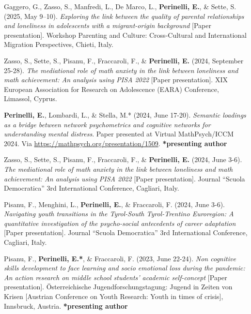 \documentclass[hidelinks, letterpaper,10pt]{article} %
\begin{document}
\begin{etaremune}
	\item Gaggero, G., Zasso, S., Manfredi, L., De Marco, L., \textbf{Perinelli, E.}, \& Sette, S. (2025, May 9–10). \textit{Exploring the link between the quality of parental relationships and loneliness in adolescents with a migrant-origin background} [Paper presentation]. Workshop Parenting and Culture: Cross-Cultural and International Migration Perspectives, Chieti, Italy.
	
	\item Zasso, S., Sette, S., Pisanu, F., Fraccaroli, F., \& \textbf{Perinelli, E.} (2024, September 25-28). \textit{The mediational role of math anxiety in the link between loneliness and math achievement: An analysis using PISA 2022} [Paper presentation]. XIX European Association for Research on Adolescence (EARA) Conference, Limassol, Cyprus.

	\item \textbf{Perinelli, E.}, Lombardi, L., \& Stella, M.* (2024, June 17-20). \textit{Semantic loadings as a bridge between network psychometrics and cognitive networks for understanding mental distress}. Paper presented at Virtual MathPsych/ICCM 2024. Via \url{https://mathpsych.org/presentation/1509}. \textbf{*presenting author}
	
	\item Zasso, S., Sette, S., Pisanu, F., Fraccaroli, F., \& \textbf{Perinelli, E.} (2024, June 3-6). \textit{The mediational role of math anxiety in the link between loneliness and math achievement: An analysis using PISA 2022} [Paper presentation]. Journal ``Scuola Democratica'' 3rd International Conference, Cagliari, Italy.

	\item Pisanu, F., Menghini, L., \textbf{Perinelli, E.}, \& Fraccaroli, F. (2024, June 3-6). \textit{Navigating youth transitions in the Tyrol-South Tyrol-Trentino Euroregion: A quantitative investigation of the psycho-social antecedents of career adaptation} [Paper presentation]. Journal ``Scuola Democratica'' 3rd International Conference, Cagliari, Italy.

	\item Pisanu, F., \textbf{Perinelli, E.*}, \& Fraccaroli, F. (2023, June 22-24). \textit{Non cognitive skills development to face learning and socio emotional loss during the pandemic: An action research on middle school students' academic self-concept} [Paper presentation]. Österreichische Jugendforschungstagung: Jugend in Zeiten von Krisen [Austrian Conference on Youth Research: Youth in times of crisis], Innsbruck, Austria. \textbf{*presenting author}


\end{etaremune}
\end{document}
